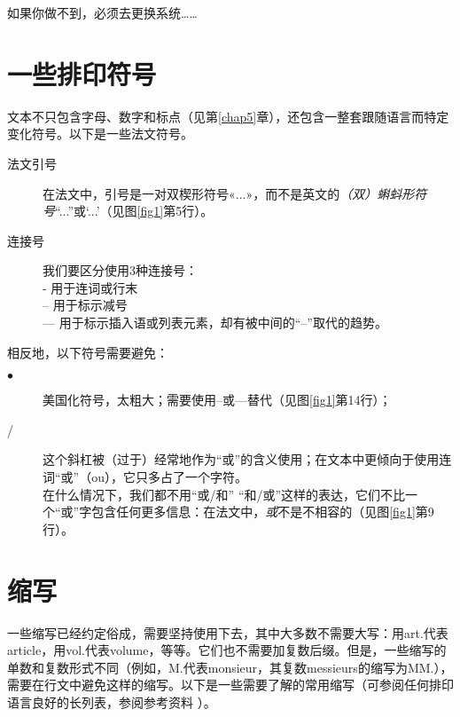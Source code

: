 如果你做不到，必须去更换系统……

\section{一些排印符号}

文本不只包含字母、数字和标点（见第\ref{chap5}章），还包含一整套跟随语言而特定变化符号。以下是一些法文符号。

\begin{description}
    \item[法文引号] 在法文中，引号是一对双楔形符号«...»，而不是英文的\emph{（双）蝌蚪形符号}``...''或`...'（见图\ref{fig1}第5行）。
    \item[连接号] 我们要区分使用3种连接号：\\
    - 用于连词或行末\\
    -- 用于标示减号\\
    --- 用于标示插入语或列表元素，却有被中间的``--''取代的趋势。
\end{description}

相反地，以下符号需要避免：

\begin{description}
    \item[$\bullet$] 美国化符号，太粗大；需要使用--或---替代（见图\ref{fig1}第14行）；
    \item[/] 这个斜杠被（过于）经常地作为``或''的含义使用；在文本中更倾向于使用连词``或''（ou），它只多占了一个字符。\\
    在什么情况下，我们都不用``或/和'' ``和/或''这样的表达，它们不比一个``或''字包含任何更多信息：在法文中，\emph{或}不是不相容的（见图\ref{fig1}第9行）。
\end{description}

\section{缩写}

一些缩写已经约定俗成，需要坚持使用下去，其中大多数不需要大写：用art.代表article，用vol.代表volume，等等。它们也不需要加复数后缀。但是，一些缩写的单数和复数形式不同（例如，M.代表monsieur，其复数messieurs的缩写为MM.），需要在行文中避免这样的缩写。以下是一些需要了解的常用缩写（可参阅任何排印语言良好的长列表，参阅参考资料%
）。

